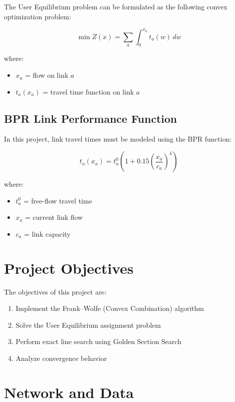 \documentclass{rapportCS} %
\begin{document}
The User Equilibrium problem can be formulated as the following convex optimization problem:

\[
\min Z(x)=\sum_{a}\int_{0}^{x_a} t_a(w)\,dw
\]

where:

\begin{itemize}
    \item $x_a$ = flow on link $a$
    \item $t_a(x_a)$ = travel time function on link $a$
\end{itemize}

\subsection{BPR Link Performance Function}

In this project, link travel times must be modeled using the BPR function:

\[
t_a(x_a)=t_a^0\left(1+0.15\left(\frac{x_a}{c_a}\right)^4\right)
\]

where:

\begin{itemize}
    \item $t_a^0$ = free-flow travel time
    \item $x_a$ = current link flow
    \item $c_a$ = link capacity
\end{itemize}

\section{Project Objectives}

The objectives of this project are:

\begin{enumerate}
    \item Implement the Frank--Wolfe (Convex Combination) algorithm
    \item Solve the User Equilibrium assignment problem
    \item Perform exact line search using Golden Section Search
    \item Analyze convergence behavior
\end{enumerate}

\section{Network and Data}
\end{document}
